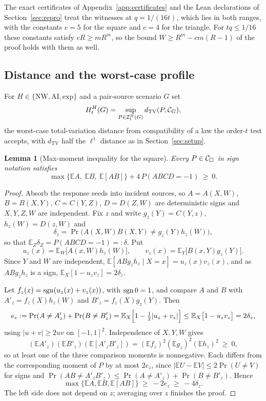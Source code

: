 \documentclass[11pt]{article}
\theoremstyle{plain}
\newtheorem{lemma}[theorem]{Lemma}
\theoremstyle{definition}
\DeclareMathOperator{\TV}{TV}
\newcommand{\E}{\mathbb E}
\begin{document}
The exact certificates of Appendix~\ref{app:certificates} and the Lean declarations of Section~\ref{sec:repro} treat the witnesses at $q=1/(16t)$, which lies in both ranges, with the constants $c=5$ for the square and $c=4$ for the triangle. For $tq\le1/16$ these constants satisfy $cR\ge mR^m$, so the bound $W\ge R^m-cm(R-1)$ of the proof holds with them as well.

\subsection{Distance and the worst-case profile}\label{sec:worstcase}

For $H\in\{\mathrm{NW},\mathrm{AI},\mathrm{exp}\}$ and a pair-source scenario $G$ set
\begin{equation}\label{eq:Hprofile}
H^H_t(G)=\sup_{P\in\mathcal I^H_t(G)}d_{\TV}(P,\Cscen{G}),
\end{equation}
the worst-case total-variation distance from compatibility of a law the order-$t$ test accepts, with $d_{\TV}$ half the $\ell^1$ distance as in Section~\ref{sec:setup}.

\begin{lemma}[Max-moment inequality for the square]\label{lem:maxmoment}
Every $P\in\mathcal C_{\square}$ in sign notation satisfies
\[
\max\{\E A,\ \E B,\ \E[AB]\}+4\,P(ABCD=-1)\ \ge\ 0 .
\]
\end{lemma}

\begin{proof}
Absorb the response seeds into incident sources, so $A=A(X,W)$, $B=B(X,Y)$, $C=C(Y,Z)$, $D=D(Z,W)$ are deterministic signs and $X,Y,Z,W$ are independent. Fix $z$ and write $g_z(Y)=C(Y,z)$, $h_z(W)=D(z,W)$ and
\[
\delta_z=\Pr\bigl(A(X,W)B(X,Y)\ne g_z(Y)h_z(W)\bigr),
\]
so that $\E_Z\delta_Z=P(ABCD=-1)=:\delta$. Put
\[
u_z(x)=\E_W\bigl[A(x,W)h_z(W)\bigr],\qquad v_z(x)=\E_Y\bigl[B(x,Y)g_z(Y)\bigr].
\]
Since $Y$ and $W$ are independent, $\E[ABg_zh_z\mid X=x]=u_z(x)v_z(x)$, and as $ABg_zh_z$ is a sign, $\E_X[1-u_zv_z]=2\delta_z$.

Let $f_z(x)=\operatorname{sgn}(u_z(x)+v_z(x))$, with $\operatorname{sgn}0=1$, and compare $A$ and $B$ with $A'_z=f_z(X)h_z(W)$ and $B'_z=f_z(X)g_z(Y)$. Then
\[
e_z:=\Pr(A\ne A'_z)+\Pr(B\ne B'_z)=\E_X\Bigl[1-\tfrac12|u_z+v_z|\Bigr]\le\E_X\bigl[1-u_zv_z\bigr]=2\delta_z,
\]
using $|u+v|\ge2uv$ on $[-1,1]^2$. Independence of $X,Y,W$ gives
\[
(\E A'_z)(\E B'_z)(\E[A'_zB'_z])=(\E f_z)^2(\E g_z)^2(\E h_z)^2\ \ge\ 0,
\]
so at least one of the three comparison moments is nonnegative. Each differs from the corresponding moment of $P$ by at most $2e_z$, since $|\E U-\E V|\le2\Pr(U\ne V)$ for signs and $\Pr(AB\ne A'_zB'_z)\le\Pr(A\ne A'_z)+\Pr(B\ne B'_z)$. Hence
\[
\max\{\E A,\E B,\E[AB]\}\ \ge\ -2e_z\ \ge\ -4\delta_z .
\]
The left side does not depend on $z$; averaging over $z$ finishes the proof.
\end{proof}
\end{document}
